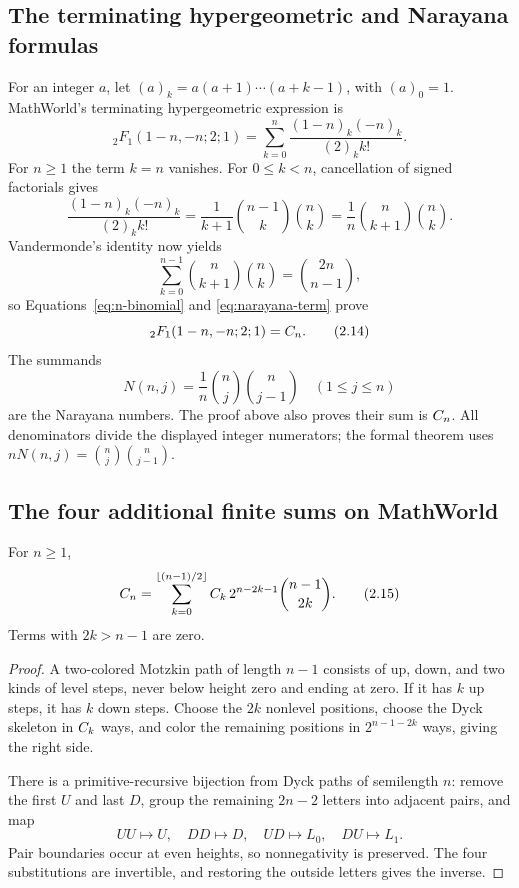\subsection{The terminating hypergeometric and Narayana formulas}

For an integer $a$, let $(a)_k=a(a+1)\cdots(a+k-1)$, with $(a)_0=1$.
MathWorld's terminating hypergeometric expression is
\[
 {}_2F_1(1-n,-n;2;1)
 =\sum_{k=0}^{n}\frac{(1-n)_k(-n)_k}{(2)_k k!}.                   \tag{2.12}\label{eq:hypergeom}
\]
For $n\ge1$ the term $k=n$ vanishes.  For $0\le k<n$, cancellation of signed
factorials gives
\[
 \frac{(1-n)_k(-n)_k}{(2)_k k!}
 =\frac1{k+1}\binom{n-1}{k}\binom nk
 =\frac1n\binom n{k+1}\binom nk.                                \tag{2.13}\label{eq:narayana-term}
\]
Vandermonde's identity now yields
\[
 \sum_{k=0}^{n-1}\binom n{k+1}\binom nk=\binom{2n}{n-1},
\]
so Equations~\eqref{eq:n-binomial} and \eqref{eq:narayana-term} prove
\[
 {}_2F_1(1-n,-n;2;1)=C_n.                                    \tag{2.14}
\]
The summands
\[
 N(n,j)=\frac1n\binom nj\binom n{j-1}\quad(1\le j\le n)
\]
are the Narayana numbers.  The proof above also proves their sum is $C_n$.
All denominators divide the displayed integer numerators; the formal theorem
uses $nN(n,j)=\binom nj\binom n{j-1}$.

\subsection{The four additional finite sums on MathWorld}

\begin{theorem}
For $n\ge1$,
\[
 C_n=\sum_{k=0}^{\left\lfloor (n-1)/2\right\rfloor}
  C_k\,2^{n-2k-1}\binom{n-1}{2k}.                             \tag{2.15}\label{eq:motzkin-sum}
\]
Terms with $2k>n-1$ are zero.
\end{theorem}

\begin{proof}
A two-colored Motzkin path of length $n-1$ consists of up, down, and two kinds
of level steps, never below height zero and ending at zero.  If it has $k$ up
steps, it has $k$ down steps.  Choose the $2k$ nonlevel positions, choose the
Dyck skeleton in $C_k$ ways, and color the remaining positions in
$2^{n-1-2k}$ ways, giving the right side.

There is a primitive-recursive bijection from Dyck paths of semilength $n$:
remove the first $U$ and last $D$, group the remaining $2n-2$ letters into
adjacent pairs, and map
\[
 UU\mapsto U,\quad DD\mapsto D,\quad UD\mapsto L_0,\quad
 DU\mapsto L_1.
\]
Pair boundaries occur at even heights, so nonnegativity is preserved.  The
four substitutions are invertible, and restoring the outside letters gives
the inverse.
\end{proof}

